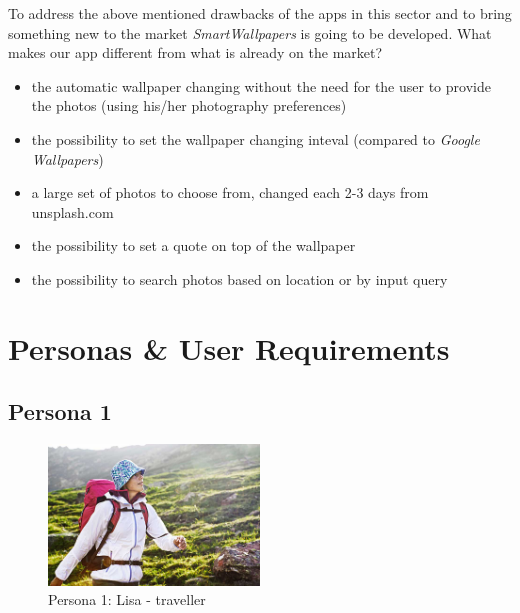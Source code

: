 \documentclass[version=last,fontsize=13pt]{scrartcl}
\begin{document}
		\indent
		To address the above mentioned drawbacks of the apps in this sector and to bring something new to the market \textit{SmartWallpapers} is going to be developed.
		What makes our app different from what is already on the market?

		\begin{itemize}
			\item the automatic wallpaper changing without the need for the user to provide the photos (using his/her photography preferences)

			\item the possibility to set the wallpaper changing inteval (compared to \textit{Google Wallpapers})
			
			\item a large set of photos to choose from, changed each 2-3 days from unsplash.com

			\item the possibility to set a quote on top of the wallpaper

			\item the possibility to search photos based on location or by input query

		\end{itemize}

\newpage

\section{Personas \& User Requirements}

\subsection{Persona 1}

\begin{figure}
		
	\centering
	\includegraphics[width = 0.5\textwidth]{imgs/Lisa.jpg}
	\caption*{Persona 1: Lisa - traveller}

\end{figure}
\end{document}

